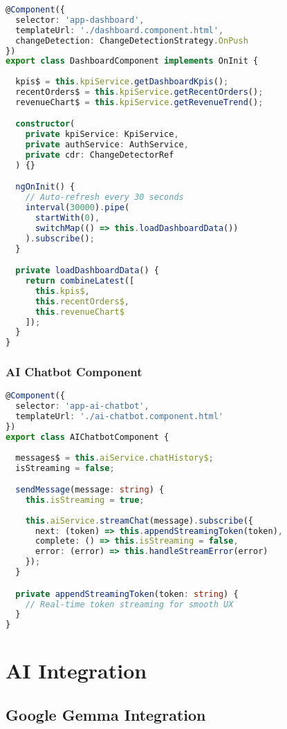 \documentclass[11pt,a4paper]{article}
\begin{document}
\begin{lstlisting}[language=typescript, caption=Dashboard Implementation]
@Component({
  selector: 'app-dashboard',
  templateUrl: './dashboard.component.html',
  changeDetection: ChangeDetectionStrategy.OnPush
})
export class DashboardComponent implements OnInit {
  
  kpis$ = this.kpiService.getDashboardKpis();
  recentOrders$ = this.kpiService.getRecentOrders();
  revenueChart$ = this.kpiService.getRevenueTrend();

  constructor(
    private kpiService: KpiService,
    private authService: AuthService,
    private cdr: ChangeDetectorRef
  ) {}

  ngOnInit() {
    // Auto-refresh every 30 seconds
    interval(30000).pipe(
      startWith(0),
      switchMap(() => this.loadDashboardData())
    ).subscribe();
  }

  private loadDashboardData() {
    return combineLatest([
      this.kpis$,
      this.recentOrders$,
      this.revenueChart$
    ]);
  }
}
\end{lstlisting}

\subsubsection{AI Chatbot Component}

\begin{lstlisting}[language=typescript, caption=AI Chatbot]
@Component({
  selector: 'app-ai-chatbot',
  templateUrl: './ai-chatbot.component.html'
})
export class AIChatbotComponent {
  
  messages$ = this.aiService.chatHistory$;
  isStreaming = false;

  sendMessage(message: string) {
    this.isStreaming = true;
    
    this.aiService.streamChat(message).subscribe({
      next: (token) => this.appendStreamingToken(token),
      complete: () => this.isStreaming = false,
      error: (error) => this.handleStreamError(error)
    });
  }

  private appendStreamingToken(token: string) {
    // Real-time token streaming for smooth UX
  }
}
\end{lstlisting}

\section{AI Integration}

\subsection{Google Gemma Integration}
\end{document}
